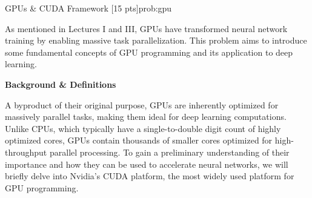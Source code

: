 \begin{problem}{GPUs \& CUDA Framework \hfill[15 pts]}{prob:gpu}

    As mentioned in Lectures I and III, GPUs have transformed neural network training by enabling massive task parallelization. This problem aims to introduce some fundamental concepts of GPU programming and its application to deep learning.

    \vspace{10px}
    \textbf{Background \& Definitions}

    A byproduct of their original purpose, GPUs are inherently optimized for massively parallel tasks, making them ideal for deep learning computations. Unlike CPUs, which typically have a single-to-double digit count of highly optimized cores, GPUs contain thousands of smaller cores optimized for high-throughput parallel processing.
    To gain a preliminary understanding of their importance and how they can be used to accelerate neural networks, we will briefly delve into Nvidia's  CUDA platform, the most widely used platform for GPU programming. 
    

\end{problem}
